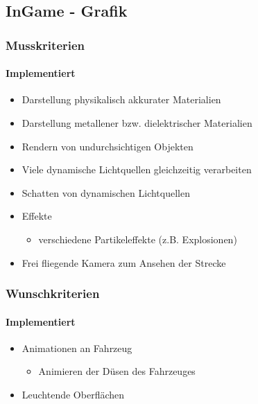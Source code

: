 \subsection{InGame - Grafik}
\subsubsection{Musskriterien}

\paragraph{Implementiert}
\begin{itemize}
    \item Darstellung physikalisch akkurater Materialien
    \item Darstellung metallener bzw. dielektrischer Materialien
		\item Rendern von undurchsichtigen Objekten
		\item Viele dynamische Lichtquellen gleichzeitig verarbeiten
		\item Schatten von dynamischen Lichtquellen
		\item Effekte
		\begin{itemize}
            \item verschiedene Partikeleffekte (z.B. Explosionen)
        \end{itemize}
        \item Frei fliegende Kamera zum Ansehen der Strecke
\end{itemize}

\subsubsection{Wunschkriterien}

\paragraph{Implementiert}
\begin{itemize}
    \item Animationen an Fahrzeug
    \begin{itemize}
        \item Animieren der Düsen des Fahrzeuges
    \end{itemize}
    \item Leuchtende Oberflächen
\end{itemize}

